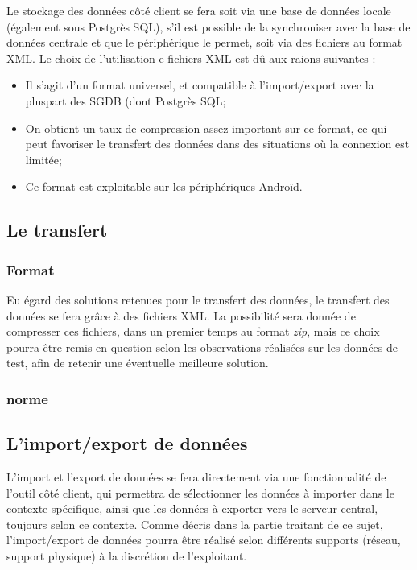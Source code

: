 Le stockage des données côté client se fera soit via une base de données locale (également sous Postgrès SQL), s'il est possible de la synchroniser avec la base de données centrale et que le périphérique le permet, soit via des fichiers au format XML.
Le choix de l'utilisation e fichiers XML est dû aux raions suivantes :
\begin{itemize}
	\item Il s'agit d'un format universel, et compatible à l'import/export avec la pluspart des SGDB (dont Postgrès SQL;
	\item On obtient un taux de compression assez important sur ce format, ce qui peut favoriser le transfert des données dans des situations où la connexion est limitée;
	\item Ce format est exploitable sur les périphériques Androïd.
\end{itemize}

\subsection{Le transfert}

\subsubsection{Format}
Eu égard des solutions retenues pour le transfert des données, le transfert des données se fera grâce à des fichiers XML.
La possibilité sera donnée de compresser ces fichiers, dans un premier temps au format \textit{zip}, mais ce choix pourra être remis en question selon les observations réalisées sur les données de test, afin de retenir une éventuelle meilleure solution.

\subsubsection{norme}

\subsection{L'import/export de données}

L'import et l'export de données se fera directement via une fonctionnalité de l'outil côté client, qui permettra de sélectionner les données à importer dans le contexte spécifique, ainsi que les données à exporter vers le serveur central, toujours selon ce contexte.
Comme décris dans la partie traitant de ce sujet, l'import/export de données pourra être réalisé selon différents supports (réseau, support physique) à la discrétion de l'exploitant.


	

